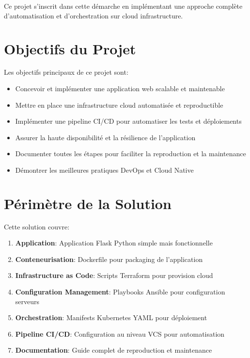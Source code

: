 \documentclass[12pt,a4paper]{report}
\begin{document}
Ce projet s'inscrit dans cette démarche en implémentant une approche complète d'automatisation et d'orchestration sur cloud infrastructure.

\section{Objectifs du Projet}

Les objectifs principaux de ce projet sont:

\begin{itemize}
    \item Concevoir et implémenter une application web scalable et maintenable
    \item Mettre en place une infrastructure cloud automatisée et reproductible
    \item Implémenter une pipeline CI/CD pour automatiser les tests et déploiements
    \item Assurer la haute disponibilité et la résilience de l'application
    \item Documenter toutes les étapes pour faciliter la reproduction et la maintenance
    \item Démontrer les meilleures pratiques DevOps et Cloud Native
\end{itemize}

\section{Périmètre de la Solution}

Cette solution couvre:

\begin{enumerate}
    \item \textbf{Application}: Application Flask Python simple mais fonctionnelle
    \item \textbf{Conteneurisation}: Dockerfile pour packaging de l'application
    \item \textbf{Infrastructure as Code}: Scripts Terraform pour provision cloud
    \item \textbf{Configuration Management}: Playbooks Ansible pour configuration serveurs
    \item \textbf{Orchestration}: Manifests Kubernetes YAML pour déploiement
    \item \textbf{Pipeline CI/CD}: Configuration au niveau VCS pour automatisation
    \item \textbf{Documentation}: Guide complet de reproduction et maintenance
\end{enumerate}
\end{document}
